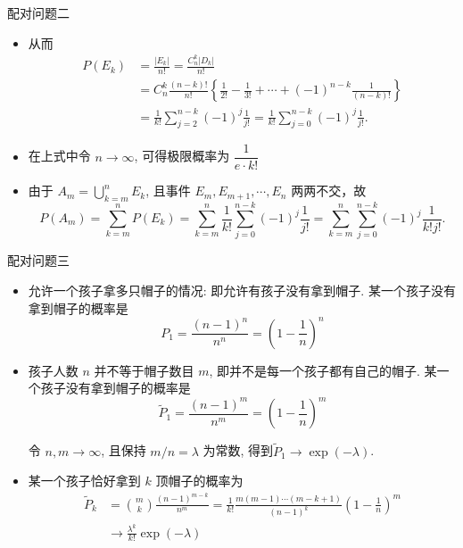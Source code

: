 \begin{frame}{配对问题二}


	\begin{itemize}[<+-|alert@+>]

		\item 从而
		      \begin{align*}
			      P(E_k) & =\frac{|E_k|}{n!}=\frac{C_n^k|D_k|}{n!}                                                           \\
			             & =C_n^k\frac{(n-k)!}{n!}\left\{\frac{1}{2!}-\frac{1}{3!}+\cdots+(-1)^{n-k}\frac{1}{(n-k)!}\right\} \\    				&=\frac{1}{k!}\sum_{j=2}^{n-k}(-1)^j\frac{1}{j!}=\frac{1}{k!}\sum_{j=0}^{n-k}(-1)^j\frac{1}{j!}.
		      \end{align*}
		\item 在上式中令 $n\rightarrow\infty$, 可得极限概率为 $\dfrac{1}{e\cdot k!}$
		\item 由于 $A_m=\bigcup\limits_{k=m}^{n} E_k$, 且事件 $E_m,E_{m+1},\cdots,E_n$ 两两不交，故
		      $$P(A_m)=\sum_{k=m}^{n}P(E_k)=\sum_{k=m}^{n}\frac{1}{k!}\sum_{j=0}^{n-k}(-1)^j\frac{1}{j!}=\sum_{k=m}^{n}\sum_{j=0}^{n-k}(-1)^j\frac{1}{k!j!}.$$
	\end{itemize}

\end{frame}

\begin{frame}{配对问题三}
\begin{itemize}
	\item 允许一个孩子拿多只帽子的情况: 即允许有孩子没有拿到帽子. 某一个孩子没有拿到帽子的概率是
	\[
	P_{1}=\frac{(n-1)^{n}}{n^{n}}=\left(1-\frac{1}{n}\right)^{n}
	\]
	\item 孩子人数 \( n \) 并不等于帽子数目 \( m \), 即并不是每一个孩子都有自己的帽子. 某一个孩子没有拿到帽子的概率是
	\[
	\widetilde{P}_{1}=\frac{(n-1)^{m}}{n^{m}}=\left(1-\frac{1}{n}\right)^{m}
	\]

	令 \( n, m \rightarrow \infty \), 且保持 \( m / n=\lambda \) 为常数, 得到$\widetilde{P}_{1} \rightarrow \exp (-\lambda)$.

	\item 某一个孩子恰好拿到 \( k \) 顶帽子的概率为
	\[
	\begin{aligned}
	\widetilde{P}_{k} & =\binom{m}{k} \frac{(n-1)^{m-k}}{n^{m}} =\frac{1}{k!} \frac{m(m-1) \cdots(m-k+1)}{(n-1)^{k}}\left(1-\frac{1}{n}\right)^{m} \\
	& \rightarrow \frac{\lambda^{k}}{k!} \exp (-\lambda)
	\end{aligned}
	\]
\end{itemize}
\end{frame}




